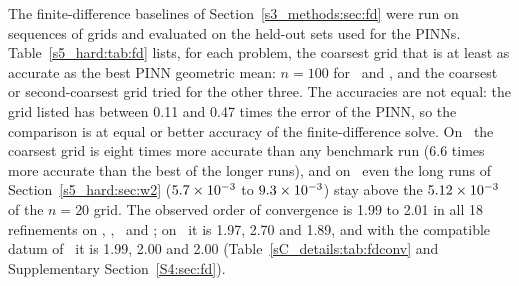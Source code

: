 The finite-difference baselines of Section~\ref{s3_methods:sec:fd} were run on sequences of
grids and evaluated on the held-out sets used for the PINNs.
Table~\ref{s5_hard:tab:fd} lists, for each problem, the coarsest grid that is at least as
accurate as the best PINN geometric mean: $n=100$ for \PH\ and \PLtwo, and the coarsest or
second-coarsest grid tried for the other three.
The accuracies are not equal: the grid listed has between 0.11 and 0.47 times the error of
the PINN, so the comparison is at equal or better accuracy of the finite-difference
solve.
On \PWone\ the coarsest grid is eight times more accurate than any benchmark run (6.6 times
more accurate than the best of the longer runs), and on \PWtwo\ even the long runs of
Section~\ref{s5_hard:sec:w2} ($5.7\times 10^{-3}$ to $9.3\times 10^{-3}$) stay above the
$5.12\times 10^{-3}$ of the $n=20$ grid.
The observed order of convergence is 1.99 to 2.01 in all 18 refinements on \PH, \PWone,
\PWtwo\ and \PLtwo; on \PLthree\ it is 1.97, 2.70 and 1.89, and with the compatible datum of
\PLthreeS\ it is 1.99, 2.00 and 2.00 (Table~\ref{sC_details:tab:fdconv} and Supplementary
Section~\ref{S4:sec:fd}).

